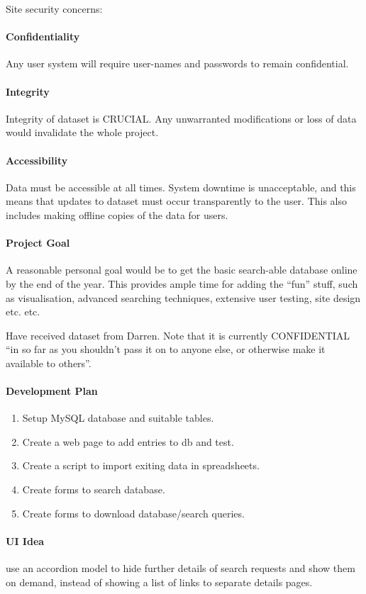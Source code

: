 \noindent
Site security concerns:

\paragraph{Confidentiality} Any user system will require user-names and passwords
to remain confidential.
\paragraph{Integrity} Integrity of dataset is CRUCIAL. Any unwarranted
modifications or loss of data would invalidate the whole project.
\paragraph{Accessibility} Data must be accessible at all times. System downtime
is unacceptable, and this means that updates to dataset must occur transparently
to the user. This also includes making offline copies of the data for users.

\paragraph{Project Goal} A reasonable personal goal would be to get the basic
search-able database online by the end of the year. This provides ample time for
adding the ``fun'' stuff, such as visualisation, advanced searching techniques,
extensive user testing, site design etc. etc.

Have received dataset from Darren. Note that it is currently CONFIDENTIAL ``in
so far as you shouldn't pass it on to anyone else, or otherwise make it
available to others''.

\paragraph{Development Plan}
\begin{enumerate}
\item Setup MySQL database and suitable tables.
\item Create a web page to add entries to db and test.
\item Create a script to import exiting data in spreadsheets.
\item Create forms to search database.
\item Create forms to download database/search queries.
\end{enumerate}

\paragraph{UI Idea} use an accordion model to hide further details of search
requests and show them on demand, instead of showing a list of links to separate
details pages.

